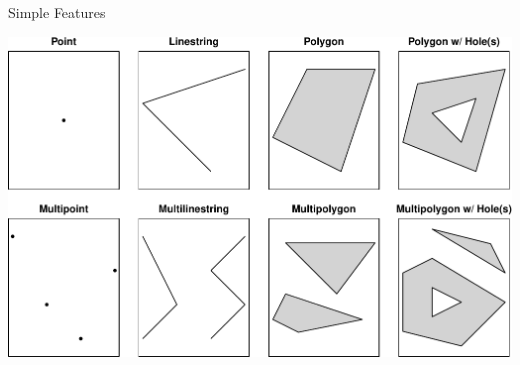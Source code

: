 \documentclass[11pt,ignorenonframetext,]{beamer}
\begin{document}
\begin{frame}{Simple Features}
\protect\hypertarget{simple-features}{}

\begin{center}\includegraphics[width=\textwidth]{Lec15_files/figure-beamer/unnamed-chunk-9-1} \end{center}

\end{frame}
\end{document}

